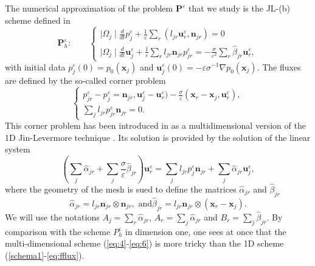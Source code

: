 \documentclass[a4paper,french,english,10pt]{article}
\newcommand\ljr{l_{jr}}
\newcommand\njr{\mathbf{n}_{jr}}
\newcommand\uu{\mathbf{u}}
\newcommand\eps{\varepsilon}
\newcommand\alj{\widehat{\alpha}_{jr}}
\newcommand\bej{\widehat{\beta}_{jr}}
\newcommand\xj{\mathbf{x}_j}
\newcommand\xr{\mathbf{x}_r}
\newcommand\uj{\uu_j}
\newcommand\ur{\uu_r}
\begin{document}
The numerical approximation  
 of the problem  $\mathbf P^\eps$ that we study 
 is the JL-(b) scheme defined
in   \cite{glaceap}
\begin{equation}\label{eq:4}
\mathbf P_h^\eps:
\qquad \left\{ 
\begin{array}{l}
\displaystyle \mid\Omega_{j}\mid\frac{d}{dt} p_{j}^{\eps}+\frac{1}{\varepsilon}
\sum_{r}(l_{jr}\ur^{\eps},\njr)=0\\
\displaystyle \mid
\Omega_{j}\mid\frac{d}{dt}\uj^{\eps}+\frac{1}{\varepsilon}
\sum_{r} l_{jr} \njr    p_{jr}^{\eps}=-\frac{\sigma}{\varepsilon^{2}}\sum_{r}\widehat{
\beta}_{jr}\ur^{\eps},
\end{array}
\right.
\end{equation}
with initial data $p_j^{\eps}(0)=p_0(\mathbf{x}_j)$ and $\mathbf{u}_j^{\eps}(0) = -\eps\sigma^{-1}\nabla p_0(\mathbf{x}_j)$.
The fluxes are defined by the so-called 
corner problem 
\begin{equation}\label{eq:5}
\left\{ \begin{array}{l}
\displaystyle 
p_{jr}^{\eps}-p_j^\eps=
\njr,    \uj^{\eps}-\ur^{\eps}
)-\frac{\sigma}{\varepsilon}( \xr -\xj, \ur^{\eps}), 
\\
\sum_{j}\ljr
p_{jr}^{\eps}\njr=0.
 \end{array}\right.
\end{equation}
This corner problem has been introduced in 
\cite{glaceap} as a multidimensional version
of the 1D Jin-Levermore technique   \cite{jinlev}.
Its solution is provided by the solution
of the  linear system
\begin{equation*} \label{eq:5bis}
\displaystyle \left( \sum_{j}\alj+ 
\sum_{j}\frac{\sigma}{\varepsilon}\bej\right)\ur^{
\eps}= \sum_{j}\ljr
p_j^{\eps}\njr+\sum_j\alj\uj^{\eps},
\end{equation*}
 where the geometry of the mesh is sued to define the  
  matrices  
$\alj$ and $\bej$ 
\begin{equation}\label{eq:6}
\alj=\ljr\njr\otimes\njr,\mbox{ and
}\bej=\ljr\njr\otimes(\xr-\xj) .
\end{equation}
We will use the notations
$A_j=\sum_r\alj$, $A_r=\sum_j\alj$ and
$B_r=\sum_j\bej$. 
By comparison with the scheme $P_h^\eps$ in dimension one, one sees at once
that the multi-dimensional scheme (\ref{eq:4}-\ref{eq:6})  is  more 
tricky than the 1D scheme (\ref{schema1}-\ref{eq:fflux}).
\end{document}
